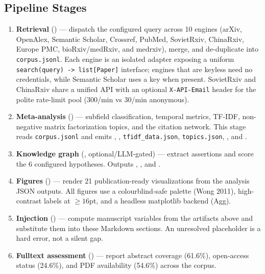 \documentclass[
  english,
]{article}
\begin{document}
\subsection{Pipeline Stages}\label{pipeline-stages}

\begin{enumerate}
\def\labelenumi{\arabic{enumi}.}
\item
  \textbf{Retrieval} () --- dispatch
  the configured query across 10 engines (arXiv, OpenAlex, Semantic
  Scholar, Crossref, PubMed, SovietRxiv, ChinaRxiv, Europe PMC,
  bioRxiv/medRxiv, and medrxiv), merge, and de-duplicate into
  \texttt{corpus.jsonl}. Each engine is an isolated adapter exposing a
  uniform \texttt{search(query)\ -\textgreater{}\ list{[}Paper{]}}
  interface; engines that are keyless need no credentials, while
  Semantic Scholar uses a key when present. SovietRxiv and ChinaRxiv
  share a unified API with an optional \texttt{X-API-Email} header for
  the polite rate-limit pool (300/min vs 30/min anonymous).
\item
  \textbf{Meta-analysis} () ---
  subfield classification, temporal metrics, TF-IDF, non-negative matrix
  factorization topics, and the citation network. This stage reads
  \texttt{corpus.jsonl} and emits
  ,
  , \texttt{tfidf\_data.json},
  \texttt{topics.json}, , and
  .
\item
  \textbf{Knowledge graph} (,
  optional/LLM-gated) --- extract assertions and score the 6 configured
  hypotheses. Outputs ,
  , and
  .
\item
  \textbf{Figures} () --- render 21
  publication-ready visualizations from the analysis JSON outputs. All
  figures use a colourblind-safe palette (Wong 2011), high-contrast
  labels at \(\geq 16\)pt, and a headless matplotlib backend (Agg).
\item
  \textbf{Injection} () --- compute
  manuscript variables from the artifacts above and substitute them into
  these Markdown sections. An unresolved placeholder is a hard error,
  not a silent gap.
\item
  \textbf{Fulltext assessment} ()
  --- report abstract coverage (61.6\%), open-access status (24.6\%),
  and PDF availability (54.6\%) across the corpus.
\end{enumerate}
\end{document}
